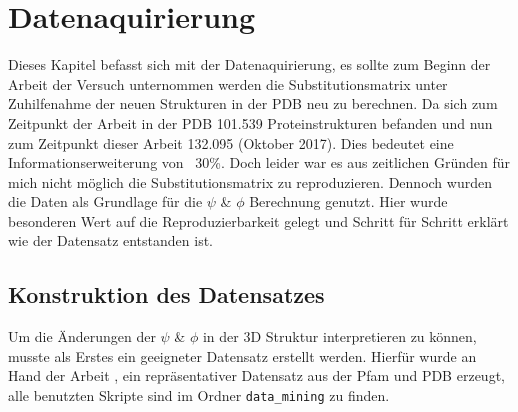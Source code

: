 \chapter[Datenaquirierung]{Datenaquirierung}
\label{chap:Datenaquirierung}

Dieses Kapitel befasst sich mit der Datenaquirierung, es sollte zum Beginn der Arbeit der Versuch unternommen werden die Substitutionsmatrix unter Zuhilfenahme der neuen Strukturen in der \ac{PDB} neu zu berechnen. Da sich zum Zeitpunkt der Arbeit \cite{Mathias.2014} in der \ac{PDB} 101.539 Proteinstrukturen befanden und nun zum Zeitpunkt dieser Arbeit 132.095 (Oktober 2017). Dies bedeutet eine Informationserweiterung von ~30\%. Doch leider war es aus zeitlichen Gründen für mich nicht möglich die Substitutionsmatrix zu reproduzieren. Dennoch wurden die Daten als Grundlage für die $\psi$ \& $\phi$ Berechnung genutzt. Hier wurde besonderen Wert auf die Reproduzierbarkeit gelegt und Schritt für Schritt erklärt wie der Datensatz entstanden ist.



\section{Konstruktion des Datensatzes}
\label{sec:konst}

Um die Änderungen der $\psi$ \& $\phi$ in der 3D Struktur interpretieren zu können, musste als Erstes ein geeigneter Datensatz erstellt werden. Hierfür wurde an Hand der Arbeit \cite{Mathias.2014}, ein repräsentativer Datensatz aus der \ac{Pfam} und \ac{PDB} erzeugt, alle benutzten Skripte sind im Ordner \texttt{data\_mining} zu finden.


